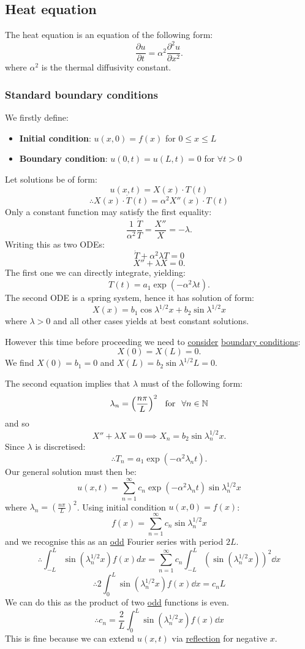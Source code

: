 \documentclass{article}
\begin{document}
\subsection{Heat equation}
The heat equation is an equation of the following form:
$$\frac{\partial u}{\partial t}=\alpha^2\frac{\partial^2 u}{\partial x^2}.$$
where $\alpha^2$ is the thermal diffusivity constant. 

\subsubsection{Standard boundary conditions}
We firstly define:
\begin{itemize}
    \item \textbf{Initial condition}: $u(x,0)=f(x)$ for $0\leq x\leq L$

    \item \textbf{Boundary condition}: $u(0,t)=u(L,t)=0$ for $\forall t>0$
\end{itemize}
Let solutions be of form:
$$u(x,t)=X(x)\cdot T(t)$$
$$\therefore X(x)\cdot \dot{T}(t)=\alpha^2 X''(x)\cdot T(t)$$
Only a constant function may satisfy the first equality:
$$\frac{1}{\alpha^2}\frac{\dot{T}}{T}=\frac{X''}{X}=-\lambda.$$
Writing this as two ODEs:
$$\dot{T}+\alpha^2\lambda T=0$$
$$X''+\lambda X=0.$$
The first one we can directly integrate, yielding:
$$T(t)=a_1\exp\left(-\alpha^2\lambda t\right).$$
The second ODE is a spring system, hence it has solution of form:
$$X(x)=b_1\cos\lambda^{1/2} x+b_2\sin\lambda^{1/2} x$$
where $\lambda>0$ and all other cases yields at best constant solutions.

\newpage

However this time before proceeding we need to \underline{consider}
\underline{boundary conditions}:
$$X(0)=X(L)=0.$$
We find $X(0)=b_1=0$ and $X(L)=b_2\sin\lambda^{1/2} L=0$.

The second equation implies that $\lambda$ must of the following form:
$$\lambda_n=\left(\frac{n\pi}{L}\right)^2
\hspace{0.1in}\text{for}\hspace{0.1in}\forall n\in\mathbb{N}$$
and so
$$X''+\lambda X=0\implies X_n=b_2\sin\lambda_n^{1/2} x.$$
Since $\lambda$ is discretised:
$$\therefore T_n=a_1\exp\left(-\alpha^2\lambda_n t\right).$$
Our general solution must then be:
$$u(x,t)=\sum_{n=1}^{\infty}c_n\exp\left(-\alpha^2\lambda_n t\right)
\sin\lambda_n^{1/2} x$$
where $\lambda_n=\left(\frac{n\pi}{L}\right)^2$. Using initial condition $u(x,0)=f(x)$:
$$f(x)=\sum_{n=1}^{\infty}c_n\sin\lambda_n^{1/2} x$$
and we recognise this as an \underline{odd} Fourier series with period $2L$.
$$\therefore\int_{-L}^{L}\sin(\lambda_n^{1/2} x) f(x)dx=\sum_{n=1}^{\infty}c_n\int_{-L}^{L}\left(
\sin(\lambda_n^{1/2} x)\right)^2\dd x$$
$$\therefore2\int_{0}^{L}\sin(\lambda_n^{1/2} x) f(x)\dd x
=c_n L$$
We can do this as the product of two \underline{odd} functions is even.
$$\therefore c_n=\frac{2}{L}\int_{0}^{L}\sin(\lambda_n^{1/2} x) f(x)\dd x$$
This is fine because we can extend $u(x,t)$ via \underline{reflection} for negative $x$.
\end{document}
